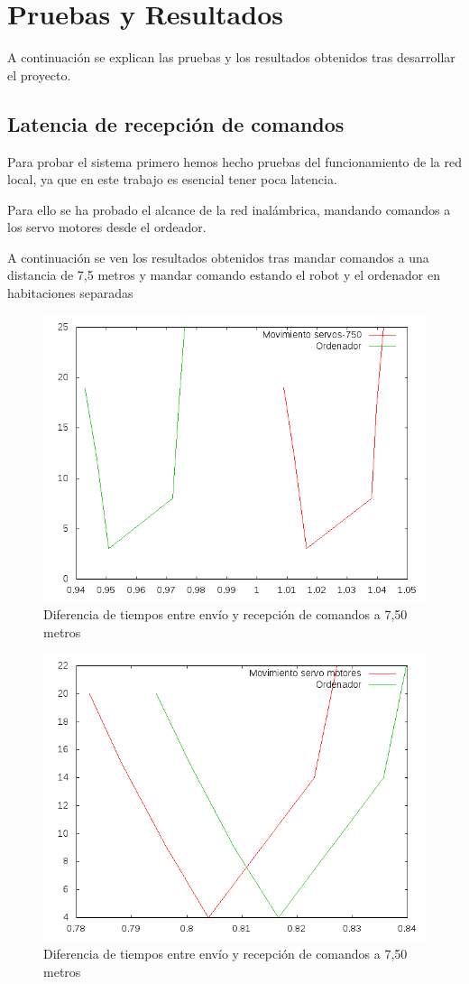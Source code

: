 \documentclass[twoside, 12pt]{epstfg}
\begin{document}
\chapter{Pruebas y Resultados}

A continuación se explican las pruebas y los resultados obtenidos tras desarrollar el proyecto.

\section{Latencia de recepción de comandos}

Para probar el sistema primero hemos hecho pruebas del funcionamiento de la red local, ya que en este trabajo es esencial tener poca latencia.

Para ello se ha probado el alcance de la red inalámbrica, mandando comandos a los servo motores desde el ordeador.

A continuación se ven los resultados obtenidos tras mandar comandos a una distancia de 7,5 metros y mandar comando estando el robot y el ordenador en habitaciones separadas

\begin{figure}[h!]
	\centerline{
		\mbox{\includegraphics[width=.80\textwidth]{images/Temp_750.png}}
	}
	\caption{Diferencia de tiempos entre envío y recepción de comandos a 7,50 metros}
\end{figure}

\begin{figure}[h!]
	\centerline{
		\mbox{\includegraphics[width=.80\textwidth]{images/Temp_fuera.png}}
	}
	\caption{Diferencia de tiempos entre envío y recepción de comandos a 7,50 metros}
\end{figure}
\end{document}
